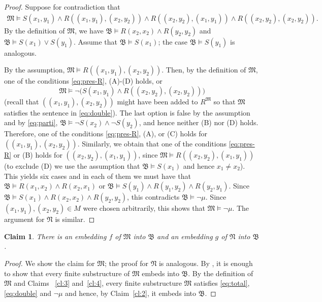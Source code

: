 \documentclass[nonacm]{acmart}
\newcommand{\bB}{{\mathfrak B}}
\newcommand{\bM}{{\mathfrak M}}
\newcommand{\bN}{{\mathfrak N}}
\newtheorem{claim}[theorem]{Claim}
\begin{document}
\begin{proof}
Suppose for contradiction that
\begin{align*}
\bM \models S(x_1,y_1) \wedge R((x_1,y_1),(x_2,y_2))
\wedge R((x_2,y_2),(x_1,y_1)) \wedge R((x_2,y_2),(x_2,y_2)).  
\end{align*}
By the definition of $\bM$, we have $\bB \models R(x_2,x_2) \wedge R(y_2,y_2)$ and $\bB \models S(x_1) \vee S(y_1)$.
Assume that $\bB \models S(x_1)$; the case $\bB \models S(y_1)$ is analogous.

By the assumption, $\bM \models R((x_1, y_1),(x_2,y_2))$. Then, by the definition of $\bM$, one of the conditions \eqref{eq:pres-R}, (A)-(D) holds, or
\[\bM \models \neg \big (S(x_1,y_1) \wedge R((x_2,y_2),(x_2,y_2)) \big) \]
(recall that $((x_1,y_1),(x_2,y_2))$ might have been added to $R^{\bM}$ so that $\bM$ satisfies the sentence in \eqref{eq:double}). The last option is false by the assumption and by \eqref{eq:parti}, $\bB \models \neg S(x_2) \wedge \neg S(y_2)$, and hence neither (B) nor (D) holds.  Therefore, one of the conditions \eqref{eq:pres-R}, (A), or (C) holds for $((x_1,y_1), (x_2,y_2))$. Similarly, we obtain that one of the conditions \eqref{eq:pres-R} or (B) holds for $((x_2,y_2),(x_1,y_1))$, since $\bM \models R((x_2, y_2),(x_1,y_1))$ (to exclude (D) we use the assumption that $\bB \models S(x_1)$ and hence $x_1 \neq x_2$). This yields six cases and in each of them
we must have that $\bB \models R(x_1,x_2) \wedge R(x_2,x_1)$ or $\bB \models S(y_1) \wedge R(y_1, y_2) \wedge R(y_2,y_1)$. Since $\bB \models S(x_1) \wedge R(x_2,x_2) \wedge R(y_2,y_2)$, this contradicts $\bB \models \neg \mu$. 
Since $(x_1,y_1),(x_2,y_2) \in M$ were chosen arbitrarily, this shows that $\bM \models \neg \mu$.
The argument for $\bN$ is similar. 
\end{proof}

\begin{claim} \label{cl:5}
There is an embedding $f$ of $\bM$ into $\bB$ and an embedding $g$ of $\bN$ into $\bB$.
\end{claim}

\begin{proof}
We show the claim for $\bM$; the proof for $\bN$ is analogous. By \cite[Lemma 4.1.7]{Book}, it is enough to show that every finite substructure of $\bM$ embeds into $\bB$. By the definition of $\bM$ and Claims ~\ref{cl:3} and~\ref{cl:4}, every finite substructure $\bM$ satisfies \eqref{eq:total}, \eqref{eq:double} and $\neg \mu$ and hence, by Claim~\ref{cl:2}, it embeds into $\bB$.
\end{proof}
\end{document}
